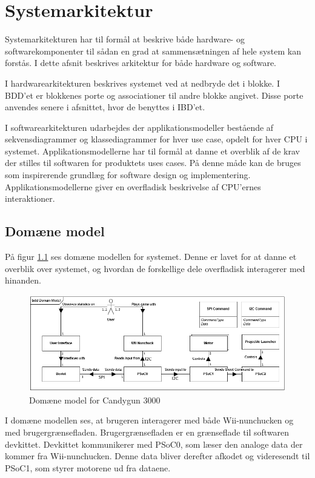 \chapter{Systemarkitektur}
Systemarkitekturen har til formål at beskrive både hardware- og softwarekomponenter til sådan en grad at sammensætningen af hele system kan forstås. I dette afsnit beskrives arkitektur for både hardware og software.

I hardwarearkitekturen beskrives systemet ved at nedbryde det i blokke. I BDD'et er blokkenes porte og associationer til andre blokke angivet. Disse porte anvendes senere i afsnittet, hvor de benyttes i IBD'et.

I softwarearkitekturen udarbejdes der applikationsmodeller bestående af sekvensdiagrammer og klassediagrammer for hver use case, opdelt for hver CPU i systemet. Applikationsmodellerne har til formål at danne et overblik af de krav der stilles til softwaren for produktets uses cases. På denne måde kan de bruges som inspirerende grundlæg for software design og implementering. Applikationsmodellerne giver en overfladisk beskrivelse af CPU'ernes interaktioner.

\section{Domæne model}
På figur \ref{fig:DomainModel} ses domæne modellen for systemet. Denne er lavet for at danne et overblik over systemet, og hvordan de forskellige dele overfladisk interagerer med hinanden. 

\begin{figure}[H]
	\centering
	\includegraphics[width=\textwidth]{Systemarkitektur/images/DomainModel}
	\caption{Domæne model for Candygun 3000}
	\label{fig:DomainModel}
\end{figure}

I domæne modellen ses, at brugeren interagerer med både Wii-nunchucken og med brugergrænsefladen. Brugergrænsefladen er en grænseflade til softwaren devkittet. Devkittet kommunikerer med PSoC0, som læser den analoge data der kommer fra Wii-nunchucken. Denne data bliver derefter afkodet og videresendt til PSoC1, som styrer motorene ud fra dataene.

